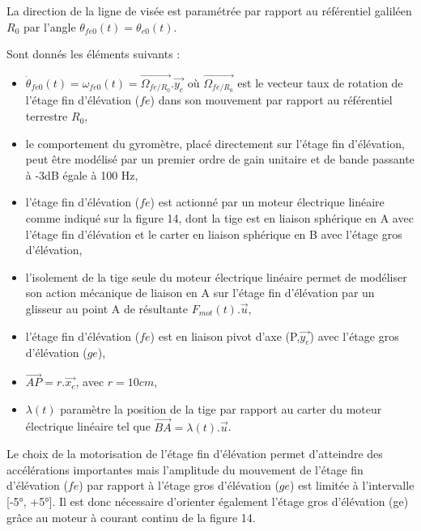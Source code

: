 La direction de la ligne de visée est paramétrée par rapport au référentiel galiléen $R_0$ par l'angle $\theta_{fe0}(t)=\theta_{e0}(t)$.

Sont donnés les éléments suivants :
\begin{itemize}
 \item $\dot{\theta}_{fe0}(t)=\omega_{fe0}(t)=\overrightarrow{\Omega_{fe/R_0}}.\overrightarrow{y_e}$ où $\overrightarrow{\Omega_{fe/R_0}}$ est le vecteur taux de rotation de l'étage fin d'élévation ($fe$) dans son mouvement par rapport au référentiel terrestre $R_0$,
 \item le comportement du gyromètre, placé directement sur l'étage fin d'élévation, peut être modélisé par un premier ordre de gain unitaire et de bande passante à -3dB égale à 100 Hz,
 \item l'étage fin d'élévation ($fe$) est actionné par un moteur électrique linéaire comme indiqué sur la figure 14, dont la tige est en liaison sphérique en A avec l'étage fin d'élévation et le carter en liaison sphérique en B avec l'étage gros d'élévation,
 \item l'isolement de la tige seule du moteur électrique linéaire permet de modéliser son action mécanique de liaison en A sur l'étage fin d'élévation par un glisseur au point A de résultante $F_{mot}(t).\overrightarrow{u}$,
 \item l'étage fin d'élévation ($fe$) est en liaison pivot d'axe (P,$\overrightarrow{y_e}$) avec l'étage gros d'élévation ($ge$),
 \item $\overrightarrow{AP}=r.\overrightarrow{x_e}$, avec $r=10cm$,
 \item $\lambda(t)$ paramètre la position de la tige par rapport au carter du moteur électrique linéaire tel que $\overrightarrow{BA}=\lambda(t).\overrightarrow{u}$.
\end{itemize}

Le choix de la motorisation de l'étage fin d'élévation permet d'atteindre des accélérations importantes mais l'amplitude du mouvement de l'étage fin d'élévation ($fe$) par rapport à l'étage gros d'élévation ($ge$) est limitée à l'intervalle [-5°, +5°]. Il est donc nécessaire d'orienter également l'étage gros d'élévation (ge) grâce au moteur à courant continu de la figure 14.

